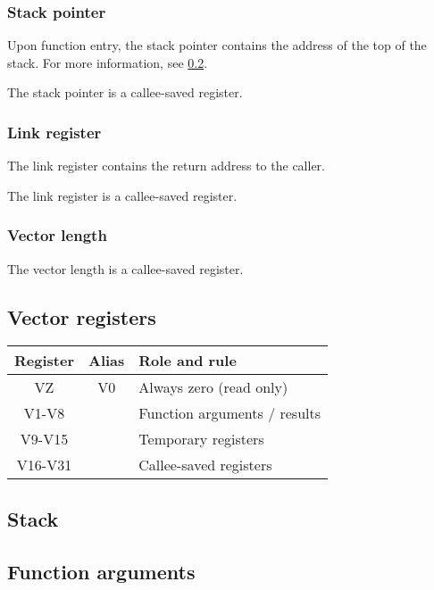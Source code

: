 \tbd

\subsubsection{Stack pointer}

Upon function entry, the stack pointer contains the address of the top of the
stack. For more information, see \ref{sec:abi_stack}.

The stack pointer is a callee-saved register.

\subsubsection{Link register}

The link register contains the return address to the caller.

The link register is a callee-saved register.

\subsubsection{Vector length}

The vector length is a callee-saved register.

\subsection{Vector registers}

\begin{tabular}{|c|c|l|}
  \hline
  \textbf{Register} & \textbf{Alias} & \textbf{Role and rule} \\
  \hline
  VZ & V0 & Always zero (read only) \\
  \hline
  V1-V8 & & Function arguments / results \\
  \hline
  V9-V15 & & Temporary registers \\
  \hline
  V16-V31 & & Callee-saved registers \\
  \hline
\end{tabular}


\subsection{Stack}
\label{sec:abi_stack}

\tbd

\subsection{Function arguments}
\label{sec:abi_function_arguments}

